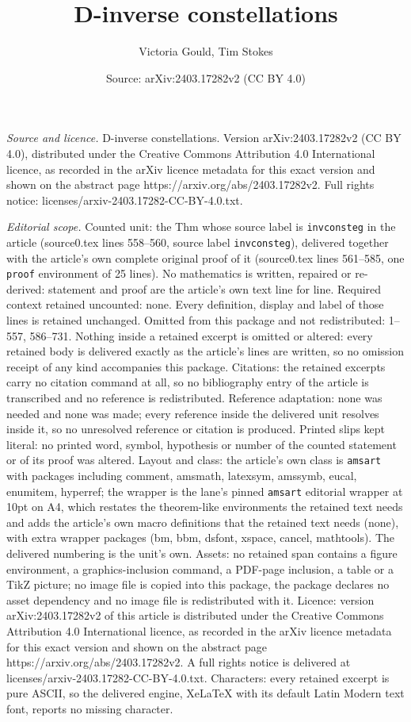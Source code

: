 \documentclass[10pt,a4paper]{amsart}
\title[D-inverse constellations]{D-inverse constellations}
\author{Victoria Gould, Tim Stokes}
\date{Source: arXiv:2403.17282v2 (CC BY 4.0)}
\begin{document}
\maketitle

\noindent\emph{Source and licence.} D-inverse constellations. Version arXiv:2403.17282v2 (CC BY 4.0), distributed under the Creative Commons Attribution 4.0 International licence, as recorded in the arXiv licence metadata for this exact version and shown on the abstract page https://arxiv.org/abs/2403.17282v2. Full rights notice: licenses/arxiv-2403.17282-CC-BY-4.0.txt.\par\smallskip

\noindent\textit{Editorial scope.} Counted unit: the Thm whose source label is \texttt{invconsteg} in the article (source0.tex lines 558--560, source label \texttt{invconsteg}), delivered together with the article's own complete original proof of it (source0.tex lines 561--585, one \texttt{proof} environment of 25 lines). No mathematics is written, repaired or re-derived: statement and proof are the article's own text line for line. Required context retained uncounted: none. Every definition, display and label of those lines is retained unchanged. Omitted from this package and not redistributed: 1--557, 586--731. Nothing inside a retained excerpt is omitted or altered: every retained body is delivered exactly as the article's lines are written, so no omission receipt of any kind accompanies this package. Citations: the retained excerpts carry no citation command at all, so no bibliography entry of the article is transcribed and no reference is redistributed. Reference adaptation: none was needed and none was made; every reference inside the delivered unit resolves inside it, so no unresolved reference or citation is produced. Printed slips kept literal: no printed word, symbol, hypothesis or number of the counted statement or of its proof was altered. Layout and class: the article's own class is \texttt{amsart} with packages including comment, amsmath, latexsym, amssymb, eucal, enumitem, hyperref; the wrapper is the lane's pinned \texttt{amsart} editorial wrapper at 10pt on A4, which restates the theorem-like environments the retained text needs and adds the article's own macro definitions that the retained text needs (none), with extra wrapper packages (bm, bbm, dsfont, xspace, cancel, mathtools). The delivered numbering is the unit's own. Assets: no retained span contains a figure environment, a graphics-inclusion command, a PDF-page inclusion, a table or a TikZ picture; no image file is copied into this package, the package declares no asset dependency and no image file is redistributed with it. Licence: version arXiv:2403.17282v2 of this article is distributed under the Creative Commons Attribution 4.0 International licence, as recorded in the arXiv licence metadata for this exact version and shown on the abstract page https://arxiv.org/abs/2403.17282v2. A full rights notice is delivered at licenses/arxiv-2403.17282-CC-BY-4.0.txt. Characters: every retained excerpt is pure ASCII, so the delivered engine, XeLaTeX with its default Latin Modern text font, reports no missing character.
\end{document}
